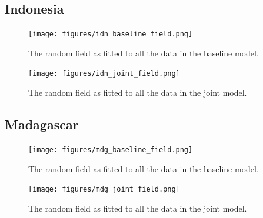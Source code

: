 \documentclass[10pt,a4]{article}
\begin{document}
\clearpage
\subsection{Indonesia}




\begin{figure}[h!]
\centering

\texttt{[image: figures/idn\_baseline\_field.png]}

\caption{The random field as fitted to all the data in the baseline model.}
\label{baselinefieldidn}
\end{figure}



\begin{figure}[h!]
     \centering
     \label{gpsencov}
\end{figure}

\begin{figure}[h!]
\centering

\texttt{[image: figures/idn\_joint\_field.png]}

\caption{The random field as fitted to all the data in the joint model.}
\label{jointfieldidn}
\end{figure}



\clearpage
\subsection{Madagascar}





\begin{figure}[h!]
\centering

\texttt{[image: figures/mdg\_baseline\_field.png]}

\caption{The random field as fitted to all the data in the baseline model.}
\label{baselinefieldmdg}
\end{figure}




\begin{figure}[h!]
     \centering
     \label{gpsencov}
\end{figure}




\begin{figure}[h!]
\centering

\texttt{[image: figures/mdg\_joint\_field.png]}

\caption{The random field as fitted to all the data in the joint model.}
\label{jointfieldidn}
\end{figure}
\end{document}
